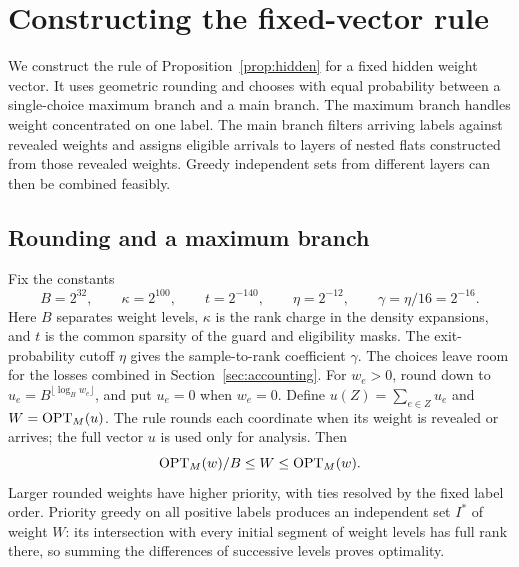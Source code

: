 \section{Constructing the fixed-vector rule}\label{sec:algorithm}

We construct the rule of Proposition~\ref{prop:hidden} for a fixed hidden
weight vector. It uses geometric rounding and chooses with equal
probability between a single-choice maximum branch and a main branch.
The maximum branch handles weight concentrated on one label. The main
branch filters arriving labels against revealed weights and assigns
eligible arrivals to layers of nested flats constructed from those
revealed weights. Greedy independent sets from different layers can
then be combined feasibly.

\subsection{Rounding and a maximum branch}

Fix the constants
\begin{equation}\label{eq:constants}
 B=2^{32},\qquad \kappa=2^{100},\qquad t=2^{-140},\qquad
 \eta=2^{-12},\qquad \gamma=\eta/16=2^{-16}.
\end{equation}
Here $B$ separates weight levels, $\kappa$ is the rank charge in the
density expansions, and $t$ is the common sparsity of the guard and
eligibility masks. The exit-probability cutoff $\eta$ gives the
sample-to-rank coefficient $\gamma$. The choices leave room for the
losses combined in Section~\ref{sec:accounting}.
For $w_e>0$, round down to $u_e=B^{\lfloor\log_B w_e\rfloor}$, and put
$u_e=0$ when $w_e=0$. Define $u(Z)=\sum_{e\in Z}u_e$ and
$W=\operatorname{OPT}_M(u)$. The rule rounds each coordinate when its weight is
revealed or arrives; the full vector $u$ is used only for analysis. Then
\begin{equation}\label{eq:rounding}
 \operatorname{OPT}_M(w)/B\le W\le\operatorname{OPT}_M(w).
\end{equation}
Larger rounded weights have higher priority, with ties resolved by the fixed
label order. Priority greedy on all positive labels produces an independent
set $I^*$ of weight $W$: its intersection with every initial segment of
weight levels has full rank there, so summing the differences of successive
levels proves optimality.

